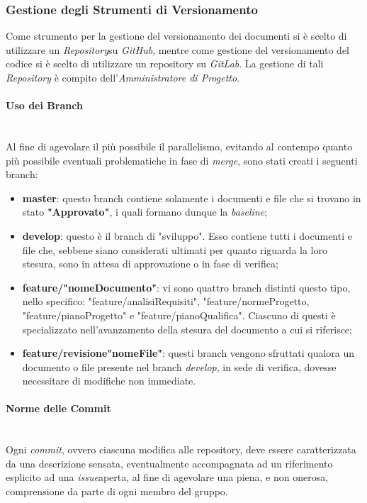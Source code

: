 \subsubsection{Gestione degli Strumenti di Versionamento}\label{ProcessiOrganizzativi_Procedure_GestioneStrumentiVersionamento}
	Come strumento per la gestione del versionamento dei documenti si è scelto di utilizzare un \textit{Repository}\glossario su \textit{GitHub}\glossario, mentre come gestione del versionamento del codice si è scelto di utilizzare un repository su \textit{GitLab}. La gestione di tali \textit{Repository} è compito dell'\textit{Amministratore di Progetto}.

\paragraph{Uso dei Branch} ~\\
	Al fine di agevolare il più possibile il parallelismo, evitando al contempo quanto più possibile eventuali problematiche in fase di \textit{merge}\glossario, sono stati creati i seguenti branch\glossario:
	\begin{itemize}
	\item \textbf{master}: questo branch contiene solamente i documenti e file che si trovano in stato \textbf{"Approvato"}, i quali formano dunque la \textit{baseline}\glossario;
	\item \textbf{develop}: questo è il branch di "sviluppo". Esso contiene tutti i documenti e file che, sebbene siano considerati ultimati per quanto riguarda la loro stesura, sono in attesa di approvazione o in fase di verifica;
	\item \textbf{feature/"nomeDocumento"}: vi sono quattro branch distinti questo tipo, nello specifico: "feature/analisiRequisiti", "feature/normeProgetto, "feature/pianoProgetto" e "feature/pianoQualifica". Ciascuno di questi è specializzato nell'avanzamento della stesura del documento a cui si riferisce;
	\item \textbf{feature/revisione"nomeFile"}: questi branch vengono sfruttati qualora un documento o file presente nel branch \textit{develop}, in sede di verifica, dovesse necessitare di modifiche non immediate.
	\end{itemize}

\paragraph{Norme delle Commit} ~\\
	Ogni \textit{commit}\glossario, ovvero ciascuna modifica alle repository, deve essere caratterizzata da una descrizione sensata, eventualmente accompagnata ad un riferimento esplicito ad una \textit{issue}\glossario aperta, al fine di agevolare una piena, e non onerosa, comprensione da parte di ogni membro del gruppo.

